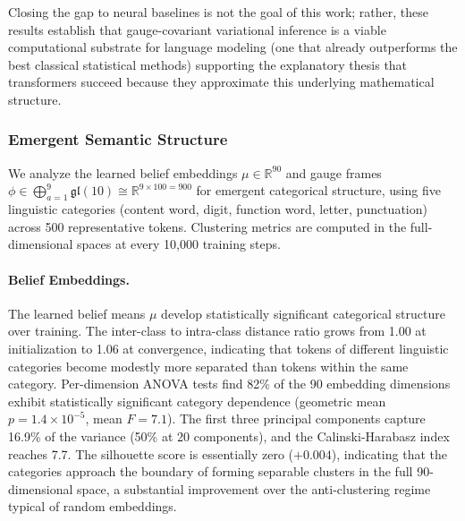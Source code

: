 \documentclass[twoside,11pt]{article}
\begin{document}
Closing the gap to neural baselines is not the goal of this work; rather, these results establish that gauge-covariant variational inference is a viable computational substrate for language modeling (one that already outperforms the best classical statistical methods) supporting the explanatory thesis that transformers succeed because they approximate this underlying mathematical structure.

\subsubsection{Emergent Semantic Structure}

We analyze the learned belief embeddings $\mu \in \mathbb{R}^{90}$ and gauge frames $\phi \in \bigoplus_{a=1}^{9} \mathfrak{gl}(10) \cong \mathbb{R}^{9 \times 100 = 900}$ for emergent categorical structure, using five linguistic categories (content word, digit, function word, letter, punctuation) across 500 representative tokens. Clustering metrics are computed in the full-dimensional spaces at every 10{,}000 training steps.

\paragraph{Belief Embeddings.} The learned belief means $\mu$ develop statistically significant categorical structure over training. The inter-class to intra-class distance ratio grows from 1.00 at initialization to 1.06 at convergence, indicating that tokens of different linguistic categories become modestly more separated than tokens within the same category. Per-dimension ANOVA tests find 82\% of the 90 embedding dimensions exhibit statistically significant category dependence (geometric mean $p = 1.4 \times 10^{-5}$, mean $F = 7.1$). The first three principal components capture 16.9\% of the variance (50\% at 20 components), and the Calinski-Harabasz index reaches 7.7. The silhouette score is essentially zero ($+0.004$), indicating that the categories approach the boundary of forming separable clusters in the full 90-dimensional space, a substantial improvement over the anti-clustering regime typical of random embeddings.
\end{document}
